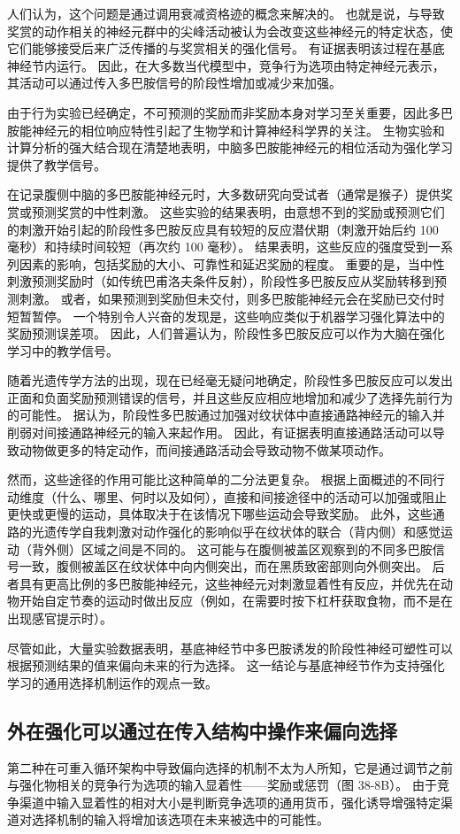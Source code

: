 人们认为，这个问题是通过调用衰减资格迹的概念来解决的。 也就是说，与导致奖赏的动作相关的神经元群中的尖峰活动被认为会改变这些神经元的特定状态，使它们能够接受后来广泛传播的与奖赏相关的强化信号。 有证据表明该过程在基底神经节内运行。 因此，在大多数当代模型中，竞争行为选项由特定神经元表示，其活动可以通过传入多巴胺信号的阶段性增加或减少来加强。

由于行为实验已经确定，不可预测的奖励而非奖励本身对学习至关重要，因此多巴胺能神经元的相位响应特性引起了生物学和计算神经科学界的关注。 生物实验和计算分析的强大结合现在清楚地表明，中脑多巴胺能神经元的相位活动为强化学习提供了教学信号。

在记录腹侧中脑的多巴胺能神经元时，大多数研究向受试者（通常是猴子）提供奖赏或预测奖赏的中性刺激。 这些实验的结果表明，由意想不到的奖励或预测它们的刺激开始引起的阶段性多巴胺反应具有较短的反应潜伏期（刺激开始后约 100 毫秒）和持续时间较短（再次约 100 毫秒）。 结果表明，这些反应的强度受到一系列因素的影响，包括奖励的大小、可靠性和延迟奖励的程度。 重要的是，当中性刺激预测奖励时（如传统巴甫洛夫条件反射），阶段性多巴胺反应从奖励转移到预测刺激。 或者，如果预测到奖励但未交付，则多巴胺能神经元会在奖励已交付时短暂暂停。 一个特别令人兴奋的发现是，这些响应类似于机器学习强化算法中的奖励预测误差项。 因此，人们普遍认为，阶段性多巴胺反应可以作为大脑在强化学习中的教学信号。

随着光遗传学方法的出现，现在已经毫无疑问地确定，阶段性多巴胺反应可以发出正面和负面奖励预测错误的信号，并且这些反应相应地增加和减少了选择先前行为的可能性。 据认为，阶段性多巴胺通过加强对纹状体中直接通路神经元的输入并削弱对间接通路神经元的输入来起作用。 因此，有证据表明直接通路活动可以导致动物做更多的特定动作，而间接通路活动会导致动物不做某项动作。

然而，这些途径的作用可能比这种简单的二分法更复杂。 根据上面概述的不同行动维度（什么、哪里、何时以及如何），直接和间接途径中的活动可以加强或阻止更快或更慢的运动，具体取决于在该情况下哪些运动会导致奖励。 此外，这些通路的光遗传学自我刺激对动作强化的影响似乎在纹状体的联合（背内侧）和感觉运动（背外侧）区域之间是不同的。 这可能与在腹侧被盖区观察到的不同多巴胺信号一致，腹侧被盖区在纹状体中向内侧突出，而在黑质致密部则向外侧突出。 后者具有更高比例的多巴胺能神经元，这些神经元对刺激显着性有反应，并优先在动物开始自定节奏的运动时做出反应（例如，在需要时按下杠杆获取食物，而不是在出现感官提示时）。

尽管如此，大量实验数据表明，基底神经节中多巴胺诱发的阶段性神经可塑性可以根据预测结果的值来偏向未来的行为选择。 这一结论与基底神经节作为支持强化学习的通用选择机制运作的观点一致。

\subsection{外在强化可以通过在传入结构中操作来偏向选择}
第二种在可重入循环架构中导致偏向选择的机制不太为人所知，它是通过调节之前与强化物相关的竞争行为选项的输入显着性——奖励或惩罚（图 38-8B）。 由于竞争渠道中输入显着性的相对大小是判断竞争选项的通用货币，强化诱导增强特定渠道对选择机制的输入将增加该选项在未来被选中的可能性。

